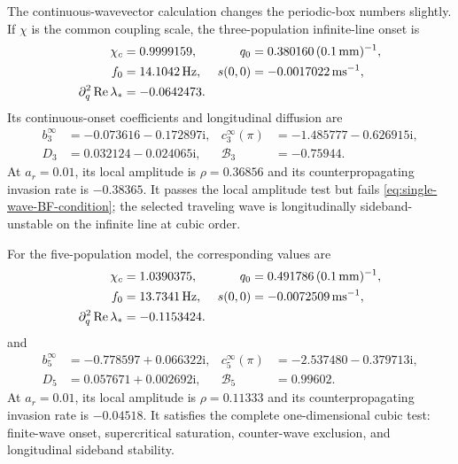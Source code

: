 \documentclass[11pt]{article}
\newcommand{\ii}{\mathrm{i}}
\newcommand{\RePart}{\operatorname{Re}}
\begin{document}
The continuous-wavevector calculation changes the periodic-box numbers
slightly.  If $\chi$ is the common coupling scale, the three-population
infinite-line onset is
\begin{equation}
 \begin{aligned}
 \chi_c&=0.9999159,
 &q_0&=0.380160\,(0.1\,{\rm mm})^{-1},\\
 f_0&=14.1042\,{\rm Hz},
 &s(0,0)&=-0.0017022\,{\rm ms}^{-1},\\
 \partial_q^2\RePart\lambda_*&=-0.0642473.
 \end{aligned}
 \label{eq:three-pop-continuous-onset}
\end{equation}
Its continuous-onset coefficients and longitudinal diffusion are
\begin{equation}
 \begin{aligned}
 b_3^\infty&=-0.073616-0.172897\ii,
 &c_3^\infty(\pi)&=-1.485777-0.626915\ii,\\
 D_3&=0.032124-0.024065\ii,
 &\mathcal B_3&=-0.75944.
 \end{aligned}
 \label{eq:three-pop-continuous-coefficients}
\end{equation}
At $a_r=0.01$, its local amplitude is $\rho=0.36856$ and its
counterpropagating invasion rate is $-0.38365$.  It passes the local
amplitude test but fails \eqref{eq:single-wave-BF-condition}; the selected
traveling wave is longitudinally sideband-unstable on the infinite line at
cubic order.

For the five-population model, the corresponding values are
\begin{equation}
 \begin{aligned}
 \chi_c&=1.0390375,
 &q_0&=0.491786\,(0.1\,{\rm mm})^{-1},\\
 f_0&=13.7341\,{\rm Hz},
 &s(0,0)&=-0.0072509\,{\rm ms}^{-1},\\
 \partial_q^2\RePart\lambda_*&=-0.1153424.
 \end{aligned}
 \label{eq:five-pop-continuous-onset}
\end{equation}
and
\begin{equation}
 \begin{aligned}
 b_5^\infty&=-0.778597+0.066322\ii,
 &c_5^\infty(\pi)&=-2.537480-0.379713\ii,\\
 D_5&=0.057671+0.002692\ii,
 &\mathcal B_5&=0.99602.
 \end{aligned}
 \label{eq:five-pop-continuous-coefficients}
\end{equation}
At $a_r=0.01$, its local amplitude is $\rho=0.11333$ and its
counterpropagating invasion rate is $-0.04518$.  It satisfies the complete
one-dimensional cubic test: finite-wave onset, supercritical saturation,
counter-wave exclusion, and longitudinal sideband stability.
\end{document}
